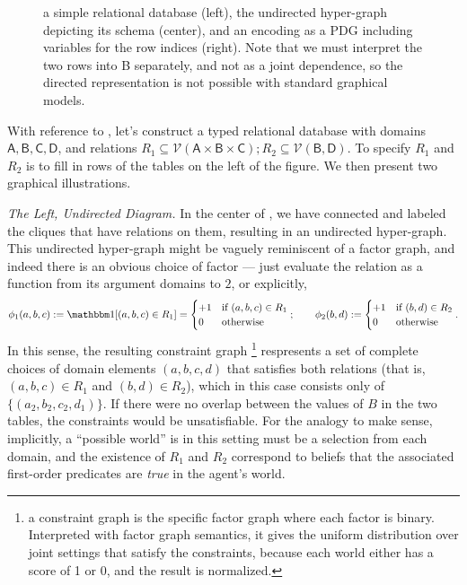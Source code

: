 \documentclass{article}
\theoremstyle{definition}
\theoremstyle{remark}
\newcommand{\var}[1]{\mathsf{#1}}
\begin{document}
\begin{figure}
    
    \caption{a simple relational database (left), the undirected hyper-graph depicting its schema (center), and an encoding as a PDG including variables for the row indices (right). Note that we must interpret the two rows into B separately, and not as a joint dependence, so the directed representation is not possible with standard graphical models.} \label{fig:sketches}
\end{figure}
\begin{example}
    With reference to , let's construct a typed relational database with domains $\var{A, B, C, D}$, and relations $R_1 \subseteq \mathcal V(\var{A\times B \times C}); R_2 \subseteq \mathcal V(\var{B, D})$. To specify $R_1$ and $R_2$ is to fill in rows of the tables on the left of the figure. We then present two graphical illustrations.
    
    \textit{The Left, Undirected Diagram.} In the center of , we have connected and labeled the cliques that have relations on them, resulting in an undirected hyper-graph. This undirected hyper-graph might be vaguely reminiscent of a factor graph, and indeed there is an obvious choice of factor --- just evaluate the relation as a function from its argument domains to $2$, or explicitly,
     \[ \phi_1(a,b,c) := \mathbbm1[(a,b,c) \in R_1]=  \begin{cases}
         +1 & \text{if } (a,b,c) \in R_1 \\ 0 & \text{otherwise}
     \end{cases};\qquad 
     \phi_2(b,d) := \begin{cases}
         +1 & \text{if } (b,d) \in R_2 \\ 0 & \text{otherwise}
     \end{cases}.\]
    In this sense, the resulting constraint graph%
        \footnote{a constraint graph is the specific factor graph where each factor is binary.
            Interpreted with factor graph semantics, it gives the uniform distribution over joint settings that satisfy the constraints, because each world either has a score of 1 or 0, and the result is normalized.}
    respresents a set of complete choices of domain elements $(a,b,c,d)$ that satisfies both relations (that is, $(a,b,c) \in R_1$ and $(b,d) \in R_2$), which in this case consists only of $\{(a_2,b_2, c_2,d_1)\}$. If there were no overlap between the values of $B$ in the two tables, the constraints would be unsatisfiable. For the analogy to make sense, implicitly, a ``possible world'' is in this setting must be a selection from each domain, and the existence of $R_1$ and $R_2$ correspond to beliefs that the associated first-order predicates are \emph{true} in the agent's world.
    

\end{example}
\end{document}
